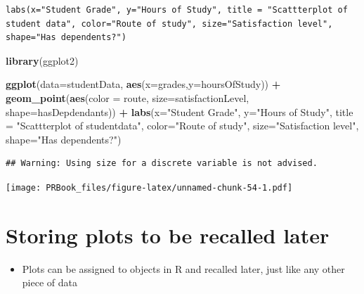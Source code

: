 \documentclass[
]{book}
\newenvironment{Shaded}{\begin{snugshade}}{\end{snugshade}}
\newcommand{\DataTypeTok}[1]{\textcolor[rgb]{0.13,0.29,0.53}{#1}}
\newcommand{\KeywordTok}[1]{\textcolor[rgb]{0.13,0.29,0.53}{\textbf{#1}}}
\newcommand{\NormalTok}[1]{#1}
\newcommand{\OperatorTok}[1]{\textcolor[rgb]{0.81,0.36,0.00}{\textbf{#1}}}
\newcommand{\StringTok}[1]{\textcolor[rgb]{0.31,0.60,0.02}{#1}}
\providecommand{\tightlist}{%
  \setlength{\itemsep}{0pt}\setlength{\parskip}{0pt}}
\begin{document}
\begin{verbatim}
labs(x="Student Grade", y="Hours of Study", title = "Scattterplot of student data", color="Route of study", size="Satisfaction level", shape="Has dependents?")
\end{verbatim}

\begin{Shaded}
\begin{Highlighting}[]
\KeywordTok{library}\NormalTok{(ggplot2)}

  \KeywordTok{ggplot}\NormalTok{(}\DataTypeTok{data=}\NormalTok{studentData, }\KeywordTok{aes}\NormalTok{(}\DataTypeTok{x=}\NormalTok{grades,}\DataTypeTok{y=}\NormalTok{hoursOfStudy)) }\OperatorTok{+}\StringTok{ }
\StringTok{    }\KeywordTok{geom_point}\NormalTok{(}\KeywordTok{aes}\NormalTok{(}\DataTypeTok{color =}\NormalTok{ route, }\DataTypeTok{size=}\NormalTok{satisfactionLevel, }\DataTypeTok{shape=}\NormalTok{hasDepdendants)) }\OperatorTok{+}
\StringTok{  }\KeywordTok{labs}\NormalTok{(}\DataTypeTok{x=}\StringTok{"Student Grade"}\NormalTok{, }\DataTypeTok{y=}\StringTok{"Hours of Study"}\NormalTok{, }\DataTypeTok{title =} \StringTok{"Scattterplot of studentdata"}\NormalTok{, }\DataTypeTok{color=}\StringTok{"Route of study"}\NormalTok{, }\DataTypeTok{size=}\StringTok{"Satisfaction level"}\NormalTok{, }\DataTypeTok{shape=}\StringTok{"Has dependents?"}\NormalTok{)}
\end{Highlighting}
\end{Shaded}

\begin{verbatim}
## Warning: Using size for a discrete variable is not advised.
\end{verbatim}

\texttt{[image: PRBook\_files/figure-latex/unnamed-chunk-54-1.pdf]}

\hypertarget{storing-plots-to-be-recalled-later}{%
\section{Storing plots to be recalled later}\label{storing-plots-to-be-recalled-later}}

\begin{itemize}
\tightlist
\item
  Plots can be assigned to objects in R and recalled later, just like any other piece of data
\end{itemize}
\end{document}
